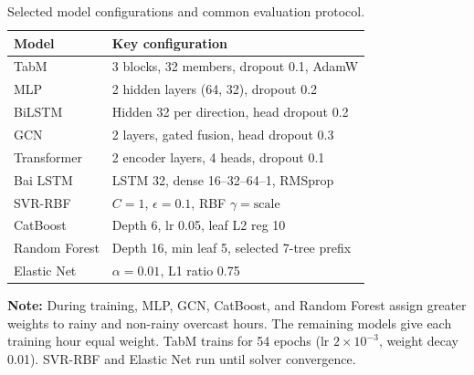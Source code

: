 \begin{table}[!htbp]
\centering
\caption{Selected model configurations and common evaluation protocol.}
\label{tab:Table03_Training_And_RFE_Protocol}
\small
\setlength{\tabcolsep}{4pt}
\renewcommand{\arraystretch}{1.15}
\begin{tabular}{@{}l l@{}}
\toprule
Model & Key configuration \\
\midrule
TabM & 3 blocks, 32 members, dropout 0.1, AdamW \\
MLP & 2 hidden layers (64, 32), dropout 0.2 \\
BiLSTM & Hidden 32 per direction, head dropout 0.2 \\
GCN & 2 layers, gated fusion, head dropout 0.3 \\
Transformer & 2 encoder layers, 4 heads, dropout 0.1 \\
Bai LSTM & LSTM 32, dense 16--32--64--1, RMSprop \\
SVR-RBF & $C=1$, $\epsilon=0.1$, RBF $\gamma=\mathrm{scale}$ \\
CatBoost & Depth 6, lr 0.05, leaf L2 reg 10 \\
Random Forest & Depth 16, min leaf 5, selected 7-tree prefix \\
Elastic Net & $\alpha=0.01$, L1 ratio 0.75 \\
\bottomrule
\end{tabular}
\par\smallskip
\parbox{\columnwidth}{\footnotesize
\textbf{Note:}
During training, MLP, GCN, CatBoost, and Random Forest
assign greater weights to rainy and non-rainy overcast
hours. The remaining models give each training hour
equal weight.
TabM trains for 54 epochs
(lr $2\times10^{-3}$, weight decay 0.01).
SVR-RBF and Elastic Net run until solver convergence.
}
\end{table}
